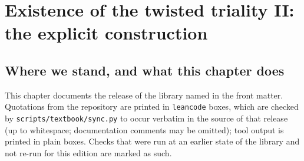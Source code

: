 \chapter{Existence of the twisted triality II: the explicit construction}\label{ch:13}

\providecommand{\chthirteenT}{\mathcal{T}}
\providecommand{\chthirteenV}{V_0^{+}}
\providecommand{\chthirteenVt}{V_3^{+}}
\providecommand{\chthirteenTs}[1]{T_{#1}^{+}}
\providecommand{\chthirteeno}{\operatorname{o}}

\section{Where we stand, and what this chapter does}\label{ch13:sec:intro}

This chapter documents the release of the library named in the front matter. Quotations from the
repository are printed in \texttt{leancode} boxes, which are checked by \texttt{scripts/textbook/sync.py} to occur verbatim in
the source of that release (up to whitespace; documentation comments may be omitted); tool output is printed in plain boxes.
Checks that were run at an earlier state of the library and not re-run for this edition are marked as such.

